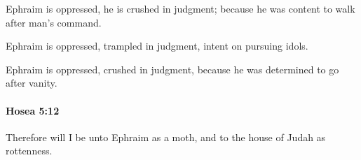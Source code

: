 			\begin{versebox}
					\item[BHS] 
					\item[LXX] 
					\item[ASV] Ephraim is oppressed, he is crushed in judgment; because he was content to walk after man's command.
					\item[NIV] Ephraim is oppressed, trampled in judgment, intent on pursuing idols.
					\item[NRSV] Ephraim is oppressed, crushed in judgment, because he was determined to go after vanity.
			\end{versebox}

		\paragraph{Hosea 5:12} %
			\label{HOSEA-5-12}

			Therefore will I be unto Ephraim as a moth, and to the house of Judah as rottenness.

